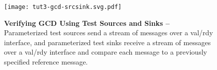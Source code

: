 
\begin{figure}
  \centering

  \texttt{[image: tut3-gcd-srcsink.svg.pdf]}

  \caption{\textbf{Verifying GCD Using Test Sources and Sinks --}
    Parameterized test sources send a stream of messages over a val/rdy
    interface, and parameterized test sinks receive a stream of messages
    over a val/rdy interface and compare each message to a previously
    specified reference message.} \label{fig-tut3-gcd-srcsink}

\end{figure}

